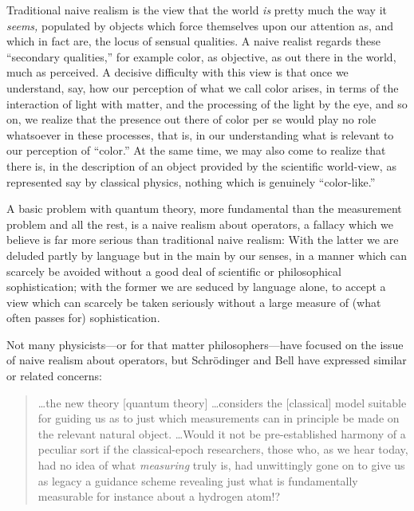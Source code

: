 \documentclass[12pt]{article}
\begin{document}
Traditional naive realism is the view that the world {\it is\/} pretty
much the way it {\it seems,\/} populated by objects which force
themselves upon our attention as, and which in fact are, the locus of
sensual qualities.  A naive realist regards these ``secondary
qualities,'' for example color, as objective, as out there in the
world, much as perceived.  A decisive difficulty with this view is
that once we understand, say, how our perception of what we call color
arises, in terms of the interaction of light with matter, and the
processing of the light by the eye, and so on, we realize that the
presence out there of color per se would play no role whatsoever in
these processes, that is, in our understanding what is relevant to our
perception of ``color.'' At the same time, we may also come to realize
that there is, in the description of an object provided by the
scientific world-view, as represented say by classical physics,
nothing which is genuinely ``color-like.''

A basic problem with quantum theory, more fundamental than the
measurement problem and all the rest, is a naive realism about
operators, a fallacy which we believe is far more serious than
traditional naive realism: With the latter we are deluded partly by
language but in the main by our senses, in a manner which can scarcely
be avoided without a good deal of scientific or philosophical
sophistication; with the former we are seduced by language alone, to
accept a view which can scarcely be taken seriously without a large
measure of (what often passes for) sophistication.

Not many physicists---or for that matter philosophers---have focused
on the issue of naive realism about operators, but Schr\"odinger and
Bell have expressed similar or related concerns:



\begin{quotation}\small\noindent \dots the
   new theory [quantum theory] \dots considers the [classical] model
   suitable for guiding us as to just which measurements can in
   principle be made on the relevant natural object.  \dots Would it
   not be pre-established harmony of a peculiar sort if the
   classical-epoch researchers, those who, as we hear today, had no
   idea of what {\it measuring\/} truly is, had unwittingly gone on to
   give us as legacy a guidance scheme revealing just what is
   fundamentally measurable for instance about a hydrogen
   atom!?~\cite{Sch35}
\end{quotation}
\end{document}
